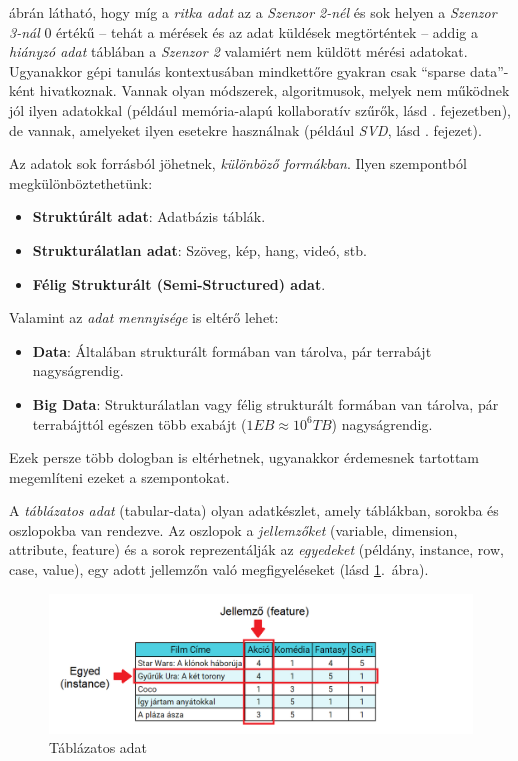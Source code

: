 \documentclass[
]{thesis-ekf}
\theoremstyle{definition}
\theoremstyle{remark}
\begin{document}
	
	 ábrán látható, hogy míg a \emph{ritka adat} az a \emph{Szenzor 2-nél} és sok helyen a \emph{Szenzor 3-nál} 0 értékű -- tehát a mérések és az adat küldések megtörténtek -- addig a \emph{hiányzó adat} táblában a \emph{Szenzor 2} valamiért nem küldött mérési adatokat. Ugyanakkor gépi tanulás kontextusában mindkettőre gyakran csak ``sparse data''-ként hivatkoznak. Vannak olyan módszerek, algoritmusok, melyek nem működnek jól ilyen adatokkal (például memória-alapú kollaboratív szűrők, lásd . fejezetben), de vannak, amelyeket ilyen esetekre használnak (például \emph{SVD}, lásd . fejezet).
	
	Az adatok sok forrásból jöhetnek, \emph{különböző formákban}. Ilyen szempontból megkülönböztethetünk:
		\begin{itemize}
			\item \textbf{Struktúrált adat}: Adatbázis táblák.
			\item \textbf{Strukturálatlan adat}: Szöveg, kép, hang, videó, stb.
			\item \textbf{Félig Strukturált (Semi-Structured) adat}.
		\end{itemize}
		
	Valamint az \emph{adat mennyisége} is eltérő lehet:
	\begin{itemize}
		\item \textbf{Data}: Általában strukturált formában van tárolva, pár terrabájt nagyságrendig.
		\item \textbf{Big Data}: Strukturálatlan vagy félig strukturált formában van tárolva, pár terrabájttól egészen több exabájt ($1EB \approx 10^6TB$) nagyságrendig.
	\end{itemize}
	Ezek persze több dologban is eltérhetnek, ugyanakkor érdemesnek tartottam megemlíteni ezeket a szempontokat.
	
	A \emph{táblázatos adat} (tabular-data) olyan adatkészlet, amely táblákban, sorokba és oszlopokba van rendezve.\cite{tabular-data-def} Az oszlopok a \emph{jellemzőket}  (variable, dimension, attribute, feature) és a sorok reprezentálják az \emph{egyedeket} (példány, instance, row, case, value), egy adott jellemzőn való megfigyeléseket (lásd \ref{fig-tabular-data}.~ábra).\cite{book:ml-for-beginners,gepitanulasalapfogalmak}
	
	\begin{figure}[!h]
		\centering
		\includegraphics[width=14cm]{images/tabular-data.PNG}
		\caption{Táblázatos adat\cite{gepitanulasalapfogalmak}}
		\label{fig-tabular-data}
	\end{figure}
	
\end{document}
